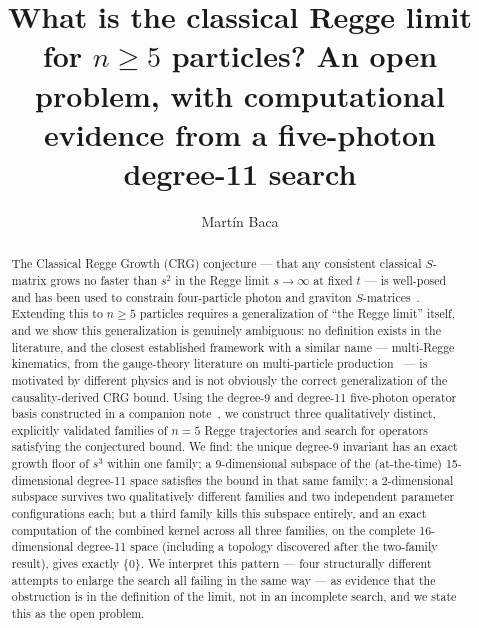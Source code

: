 \documentclass[reqno]{amsart}
\title[What is the classical Regge limit for $n\geq5$?]{What is the classical Regge limit for
$n\geq5$ particles? An open problem, with computational evidence from a five-photon degree-11
search}
\author{Mart\'in Baca}
\date{}
\begin{document}
\begin{center}
\end{center}

\begin{abstract}
The Classical Regge Growth (CRG) conjecture --- that any consistent classical $S$-matrix grows no
faster than $s^2$ in the Regge limit $s\to\infty$ at fixed $t$ --- is well-posed and has been used
to constrain four-particle photon and graviton $S$-matrices~\cite{cgghjm2019}. Extending this to
$n\geq5$ particles requires a generalization of ``the Regge limit'' itself, and we show this
generalization is genuinely ambiguous: no definition exists in the literature, and the closest
established framework with a similar name --- multi-Regge kinematics, from the gauge-theory
literature on multi-particle production~\cite{delduca1993} --- is motivated by different physics
and is not obviously the correct generalization of the causality-derived CRG bound. Using the
degree-9 and degree-11 five-photon operator basis constructed in a companion
note~\cite{fivephotons}, we construct three qualitatively distinct, explicitly validated families
of $n=5$ Regge trajectories and search for operators satisfying the conjectured bound. We find:
the unique degree-9 invariant has an exact growth floor of $s^3$ within one family; a
9-dimensional subspace of the (at-the-time) 15-dimensional degree-11 space satisfies the bound in
that same family; a 2-dimensional subspace survives two qualitatively different families and two
independent parameter configurations each; but a third family kills this subspace entirely, and an
exact computation of the combined kernel across all three families, on the complete 16-dimensional
degree-11 space (including a topology discovered after the two-family result), gives exactly
$\{0\}$. We interpret this pattern --- four structurally different attempts to enlarge the search
all failing in the same way --- as evidence that the obstruction is in the definition of the
limit, not in an incomplete search, and we state this as the open problem.
\end{abstract}
\end{document}
